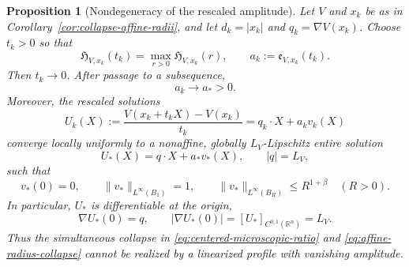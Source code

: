 \documentclass[11pt,reqno]{amsart}
\numberwithin{equation}{section}
\newcommand{\R}{\mathbb R}
\newtheorem{proposition}[theorem]{Proposition}
\theoremstyle{remark}
\begin{document}
\begin{proposition}[Nondegeneracy of the rescaled amplitude]
\label{prop:no-linear-record-neck}
Let $V$ and $x_k$ be as in Corollary~\ref{cor:collapse-affine-radii}, and
let $d_k=|x_k|$ and $q_k=\nabla V(x_k)$.  Choose $t_k>0$ so that
\begin{equation}
 \mathfrak H_{V,x_k}(t_k)
 =\max_{r>0}\mathfrak H_{V,x_k}(r),
 \qquad
 a_k:=\mathfrak e_{V,x_k}(t_k).
 \label{eq:record-scale-choice}
\end{equation}
Then $t_k\to0$.  After passage to a subsequence,
\begin{equation}
 a_k\longrightarrow a_*>0.
 \label{eq:positive-record-amplitude}
\end{equation}
Moreover, the rescaled solutions
\[
 U_k(X):=\frac{V(x_k+t_kX)-V(x_k)}{t_k}
       =q_k\cdot X+a_kv_k(X)
\]
converge locally uniformly to a nonaffine, globally $L_V$-Lipschitz entire
solution
\begin{equation}
 U_*(X)=q\cdot X+a_*v_*(X),
 \qquad |q|=L_V,
 \label{eq:gradient-contact-profile}
\end{equation}
such that
\begin{equation}
 v_*(0)=0,\qquad
 \|v_*\|_{L^\infty(B_1)}=1,\qquad
 \|v_*\|_{L^\infty(B_R)}\le R^{1+\beta}\quad(R>0).
 \label{eq:record-profile-growth}
\end{equation}
In particular, $U_*$ is differentiable at the origin,
\begin{equation}
 \nabla U_*(0)=q,
 \qquad |\nabla U_*(0)|=[U_*]_{C^{0,1}(\R^n)}=L_V.
 \label{eq:attained-maximal-gradient}
\end{equation}
Thus the simultaneous collapse in
\eqref{eq:centered-microscopic-ratio} and
\eqref{eq:affine-radius-collapse} cannot be realized by a linearized
profile with vanishing amplitude.
\end{proposition}
\end{document}
